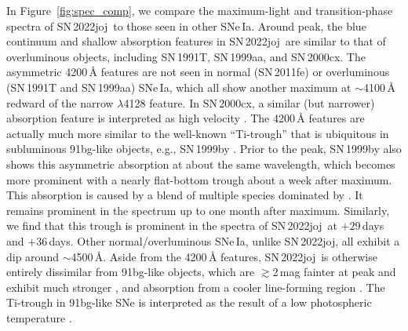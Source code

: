 \documentclass[twocolumn]{aastex631}
\newcommand{\sn}{SN\,2022joj}
\begin{document}
\begin{CJK*}{UTF8}{gbsn}
In Figure~\ref{fig:spec_comp}, we compare the maximum-light and transition-phase spectra of \sn\ to those seen in other SNe\,Ia. Around peak, the blue continuum and shallow absorption features in \sn\ are similar to that of overluminous objects, including SN\,1991T, SN\,1999aa, and SN\,2000cx. The asymmetric 4200\,\r{A} features are not seen in normal (SN\,2011fe) or overluminous (SN\,1991T and SN\,1999aa) SNe\,Ia, which all show another maximum at $\sim$4100\,\r{A} redward of the narrow  $\lambda$4128 feature. In SN\,2000cx, a similar (but narrower) absorption feature is interpreted as high velocity  \citep{Branch_00cx_2004}. The 4200\,\r{A} features are actually much more similar to the well-known ``Ti-trough'' that is ubiquitous in subluminous 91bg-like objects, e.g., SN\,1999by \citep{Arbour_1999}. Prior to the peak, SN\,1999by also shows this asymmetric absorption at about the same wavelength, which becomes more prominent with a nearly flat-bottom trough about a week after maximum. This absorption is caused by a blend of multiple species dominated by  \citep{Filippenko_91bg_1992,Mazzali_1997}. It remains prominent in the spectrum up to one month after maximum. Similarly, we find that this trough is prominent in the spectra of \sn\ at $+29$\,days and $+36$\,days. Other normal/overluminous SNe\,Ia, unlike \sn, all exhibit a dip around $\sim$4500\,\r{A}. Aside from the 4200\,\r{A} features, \sn\ is otherwise entirely dissimilar from 91bg-like objects, which are $\gtrsim$2\,mag fainter at peak and exhibit much stronger ,  and  absorption from a cooler line-forming region \citep{Filippenko_91bg_1992}. The Ti-trough in 91bg-like SNe is interpreted as the result of a low photospheric temperature \citep{Mazzali_1997}. %


\end{CJK*}
\end{document}

